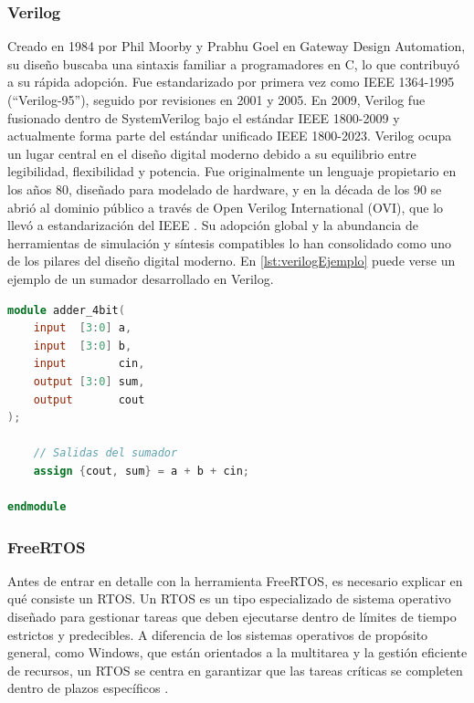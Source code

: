 \subsubsection{Verilog}
Creado en 1984 por Phil Moorby y Prabhu Goel en Gateway Design Automation, su diseño buscaba una sintaxis familiar a programadores en C, lo que contribuyó a su rápida adopción. Fue estandarizado por primera vez como IEEE 1364-1995 (“Verilog-95”), seguido por revisiones en 2001 y 2005. En 2009, Verilog fue fusionado dentro de SystemVerilog bajo el estándar IEEE 1800-2009 y actualmente forma parte del estándar unificado IEEE 1800-2023. \cite{verilogEstandar}  Verilog ocupa un lugar central en el diseño digital moderno debido a su equilibrio entre legibilidad, flexibilidad y potencia. Fue originalmente un lenguaje propietario en los años 80, diseñado para modelado de hardware, y en la década de los 90 se abrió al dominio público a través de Open Verilog International (OVI), que lo llevó a estandarización del \ac{IEEE} \cite{verilogHistoria}. Su adopción global y la abundancia de herramientas de simulación y síntesis compatibles lo han consolidado como uno de los pilares del diseño digital moderno. En \ref{lst:verilogEjemplo} puede verse un ejemplo de un sumador desarrollado en Verilog.

\begin{lstlisting}[language=verilog,frame=single,caption={Código fuente en Verilog de un sumador},showstringspaces=false,label=lst:verilogEjemplo]
module adder_4bit(
    input  [3:0] a,
    input  [3:0] b,
    input        cin,
    output [3:0] sum,
    output       cout
);

    // Salidas del sumador
    assign {cout, sum} = a + b + cin;

endmodule
\end{lstlisting}

\subsubsection{FreeRTOS}
\label{st:freertos}
Antes de entrar en detalle con la herramienta FreeRTOS, es necesario explicar en qué consiste un \ac{RTOS}. Un RTOS es un tipo especializado de sistema operativo diseñado para gestionar tareas que deben ejecutarse dentro de límites de tiempo estrictos y predecibles. A diferencia de los sistemas operativos de propósito general, como Windows, que están orientados a la multitarea y la gestión eficiente de recursos, un RTOS se centra en garantizar que las tareas críticas se completen dentro de plazos específicos \cite{rtosInfo} \cite{rtosInfo_2}. 

